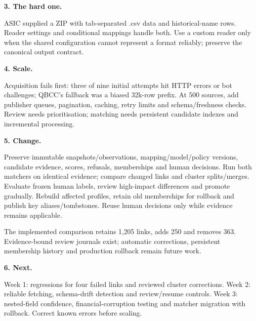 \documentclass[10pt,a4paper]{article}
\begin{document}
\vspace{4pt}
\noindent\textbf{3. The hard one.}\par
ASIC supplied a ZIP with tab-separated .csv data and historical-name rows. Reader settings and conditional mappings handle both. Use a custom reader only when the shared configuration cannot represent a format reliably; preserve the canonical output contract.\par
\vspace{4pt}
\noindent\textbf{4. Scale.}\par
Acquisition fails first: three of nine initial attempts hit HTTP errors or bot challenges; QBCC's fallback was a biased 32k-row prefix. At 500 sources, add publisher queues, pagination, caching, retry limits and schema/freshness checks. Review needs prioritisation; matching needs persistent candidate indexes and incremental processing.\par
\vspace{4pt}
\noindent\textbf{5. Change.}\par
Preserve immutable snapshots/observations, mapping/model/policy versions, candidate evidence, scores, refusals, memberships and human decisions. Run both matchers on identical evidence; compare changed links and cluster splits/merges. Evaluate frozen human labels, review high-impact differences and promote gradually. Rebuild affected profiles, retain old memberships for rollback and publish key aliases/tombstones. Reuse human decisions only while evidence remains applicable.\par
The implemented comparison retains 1,205 links, adds 250 and removes 363. Evidence-bound review journals exist; automatic corrections, persistent membership history and production rollback remain future work.\par
\vspace{4pt}
\noindent\textbf{6. Next.}\par
Week 1: regressions for four failed links and reviewed cluster corrections. Week 2: reliable fetching, schema-drift detection and review/resume controls. Week 3: nested-field confidence, financial-corruption testing and matcher migration with rollback. Correct known errors before scaling.\par
\vspace{4pt}
\end{document}
